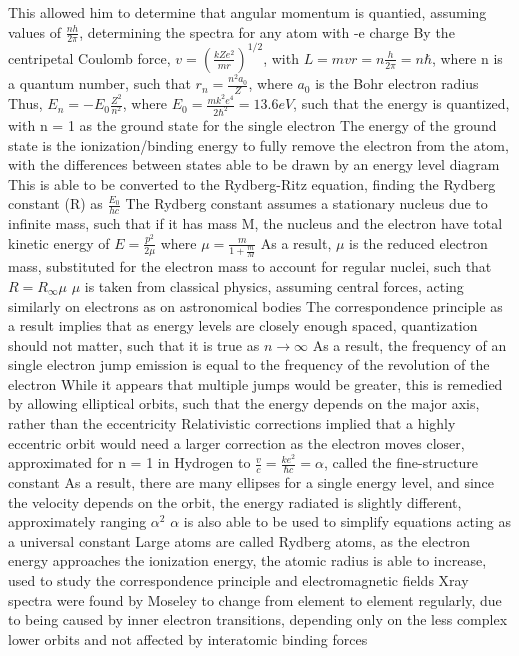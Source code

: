 \documentclass[11 pt, twoside]{article}
\newenvironment{outline*}
{
	\begin{outline}[enumerate]
	}
	{\end{outline}
}
\begin{document}
\begin{outline*}
	\2 This allowed him to determine that angular momentum is quantied, assuming values of $\frac{nh}{2\pi}$, determining the spectra for any atom with -e charge
		\3 By the centripetal Coulomb force, $v = (\frac{kZe^2}{mr})^{1/2}$, with $L = mvr = n\frac{h}{2\pi} = n\hbar$, where n is a quantum number, such that $r_n = \frac{n^2 a_0}{Z}$, where $a_0$ is the Bohr electron radius
		\3 Thus, $E_n = -E_0\frac{Z^2}{n^2}$, where $E_0 = \frac{mk^2e^4}{2\hbar^2} = 13.6 eV$, such that the energy is quantized, with n = 1 as the ground state for the single electron
			\4 The energy of the ground state is the ionization/binding energy to fully remove the electron from the atom, with the differences between states able to be drawn by an energy level diagram
		\3 This is able to be converted to the Rydberg-Ritz equation, finding the Rydberg constant (R) as $\frac{E_0}{hc}$
	\2 The Rydberg constant assumes a stationary nucleus due to infinite mass, such that if it has mass M, the nucleus and the electron have total kinetic energy of $E = \frac{p^2}{2\mu}$ where $\mu = \frac{m}{1 + \frac{m}{M}}$
		\3 As a result, $\mu$ is the reduced electron mass, substituted for the electron mass to account for regular nuclei, such that $R = R_{\infty}\mu$
		\3 $\mu$ is taken from classical physics, assuming central forces, acting similarly on electrons as on astronomical bodies
	\2 The correspondence principle as a result implies that as energy levels are closely enough spaced, quantization should not matter, such that it is true as $n \to \infty$
		\3 As a result, the frequency of an single electron jump emission is equal to the frequency of the revolution of the electron
		\3 While it appears that multiple jumps would be greater, this is remedied by allowing elliptical orbits, such that the energy depends on the major axis, rather than the eccentricity
	\2 Relativistic corrections implied that a highly eccentric orbit would need a larger correction as the electron moves closer, approximated for n = 1 in Hydrogen to $\frac{v}{c} = \frac{ke^2}{\hbar c} = \alpha$, called the fine-structure constant
		\3 As a result, there are many ellipses for a single energy level, and since the velocity depends on the orbit, the energy radiated is slightly different, approximately ranging $\alpha^2$
		\3 $\alpha$ is also able to be used to simplify equations acting as a universal constant
	\2 Large atoms are called Rydberg atoms, as the electron energy approaches the ionization energy, the atomic radius is able to increase, used to study the correspondence principle and electromagnetic fields
\1 Xray spectra were found by Moseley to change from element to element regularly, due to being caused by inner electron transitions, depending only on the less complex lower orbits and not affected by interatomic binding forces

\end{outline*}
\end{document}
